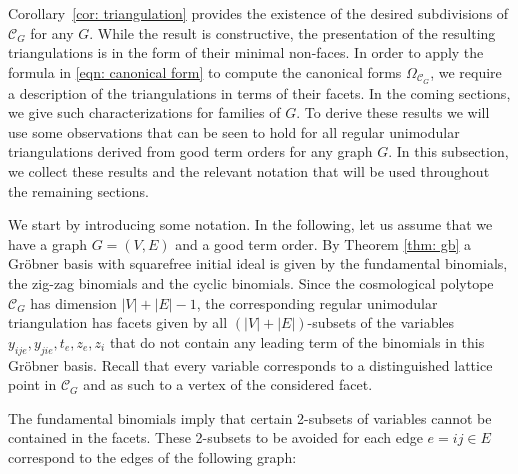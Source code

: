 Corollary~\ref{cor: triangulation} provides the existence of the desired subdivisions of $\mathcal{C}_G$ for any $G$.  
While the result is constructive, the presentation of the resulting triangulations is in the form of their minimal non-faces. 
In order to apply the formula in \eqref{eqn: canonical form} to compute the canonical forms $\Omega_{\mathcal{C}_G}$, we require a description of the triangulations in terms of their facets. 
In the coming sections, we give such characterizations for families of $G$. 
To derive these results we will use some observations that can be seen to hold for all regular unimodular triangulations derived from good term orders for any graph $G$. 
In this subsection, we collect these results and the relevant notation that will be used throughout the remaining sections. 

We start by introducing some notation.
In the following, let us assume that we have a graph $G=(V,E)$ and a good term order. 
By Theorem \ref{thm: gb} a Gr\"obner basis with squarefree initial ideal is given by the fundamental binomials, the zig-zag binomials and the cyclic binomials.
Since the cosmological polytope $\mathcal{C}_{G}$ has dimension $|V| + |E| -1$, the corresponding regular unimodular triangulation has facets given by all $(|V|+|E|)$-subsets of the variables $y_{ije}, y_{jie}, t_e, z_e, z_i$ that do not contain any leading term of the binomials in this Gr\"obner basis. Recall that every variable corresponds to a distinguished lattice point in $\mathcal{C}_G$ and as such to a vertex of the considered facet. 

The fundamental binomials imply that certain 2-subsets of variables cannot be contained in the facets.  
These 2-subsets to be avoided for each edge $e=ij\in E$ correspond to the edges of the following graph:
\begin{center}
\end{center}

